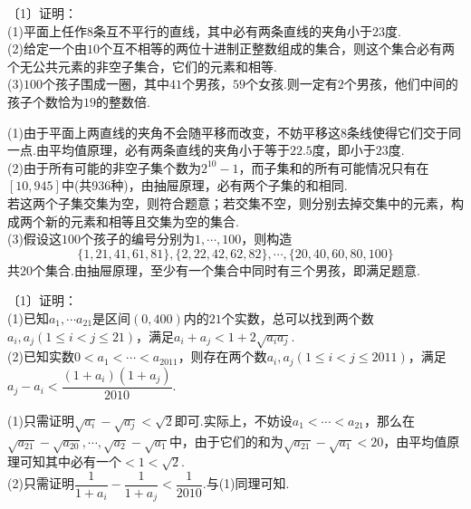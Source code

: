 \documentclass[cn,hazy,black,10pt,normal]{elegantnote}
\newcommand{\nd}[1]{〔#1〕}
\begin{document}
\begin{problem} %
	\nd{1}证明： \\
	(1)平面上任作$8$条互不平行的直线，其中必有两条直线的夹角小于$23$度. \\
	(2)给定一个由$10$个互不相等的两位十进制正整数组成的集合，则这个集合必有两个无公共元素的非空子集合，它们的元素和相等. \\
	(3)$100$个孩子围成一圈，其中$41$个男孩，$59$个女孩.则一定有$2$个男孩，他们中间的孩子个数恰为$19$的整数倍.
\end{problem}
\begin{solution}
	(1)由于平面上两直线的夹角不会随平移而改变，不妨平移这$8$条线使得它们交于同一点.由平均值原理，必有两条直线的夹角小于等于$22.5$度，即小于$23$度. \\
	(2)由于所有可能的非空子集个数为$2^{10}-1$，而子集和的所有可能情况只有在$[10,945]$中(共$936$种)，由抽屉原理，必有两个子集的和相同. \\
	若这两个子集交集为空，则符合题意；若交集不空，则分别去掉交集中的元素，构成两个新的元素和相等且交集为空的集合. \\
	(3)假设这$100$个孩子的编号分别为$1, \cdots ,100$，则构造$$\{ 1,21,41,61,81 \}, \{ 2,22,42,62,82 \}, \cdots ,\{ 20,40,60,80,100 \}$$
	共$20$个集合.由抽屉原理，至少有一个集合中同时有三个男孩，即满足题意.
\end{solution}

\begin{problem} %
	\nd{1}证明： \\
	(1)已知$a_1, \cdots a_{21}$是区间$(0,400)$内的$21$个实数，总可以找到两个数$a_i,a_j(1 \leq i < j \leq 21)$，满足$a_i+a_j < 1+2\sqrt{a_ia_j}$. \\
	(2)已知实数$0<a_1 < \cdots < a_{2011}$，则存在两个数$a_i,a_j(1 \leq i < j \leq 2011)$，满足$a_j-a_i < \dfrac{(1+a_i)(1+a_j)}{2010}$.
\end{problem}
\begin{solution}
	(1)只需证明$\sqrt{a_i}-\sqrt{a_j}<\sqrt{2}$即可.实际上，不妨设$a_1<\cdots <a_{21}$，那么在$\sqrt{a_{21}}-\sqrt{a_{20}}, \cdots ,\sqrt{a_2}-\sqrt{a_1}$中，由于它们的和为$\sqrt{a_{21}}-\sqrt{a_1} < 20$，由平均值原理可知其中必有一个$<1<\sqrt{2}$. \\
	(2)只需证明$\dfrac{1}{1+a_i}-\dfrac{1}{1+a_j} < \dfrac{1}{2010}$.与(1)同理可知.
\end{solution}
\end{document}
